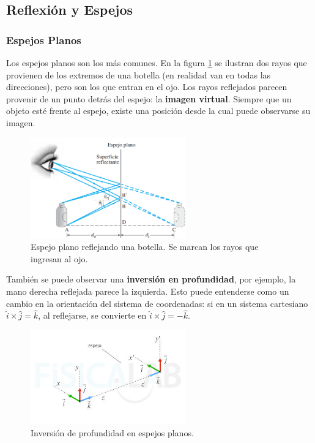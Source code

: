 \subsection{Reflexión y Espejos}

\subsubsection*{Espejos Planos}

Los espejos planos son los más comunes. En la figura \ref{fig:esplejos_planos} se ilustran dos rayos que provienen de los extremos de una botella (en realidad van en todas las direcciones), pero son los que entran en el ojo. Los rayos reflejados parecen provenir de un punto detrás del espejo: la \textbf{imagen virtual}. Siempre que un objeto esté frente al espejo, existe una posición desde la cual puede observarse su imagen.

\begin{figure}[H]
	\centering
	\includegraphics[width=0.6\textwidth]{images/espejo_plano.png}
	\caption{Espejo plano reflejando una botella. Se marcan los rayos que ingresan al ojo.}
	\label{fig:esplejos_planos}
\end{figure}

También se puede observar una \textbf{inversión en profundidad}, por ejemplo, la mano derecha reflejada parece la izquierda. Esto puede entenderse como un cambio en la orientación del sistema de coordenadas: si en un sistema cartesiano $\hat{i} \times \hat{j} = \hat{k}$, al reflejarse, se convierte en $\hat{i} \times \hat{j} = -\hat{k}$.

\begin{figure}[H]
	\centering
	\includegraphics[width=0.6\textwidth]{images/inversion_profundidad.jpg}
	\caption{Inversión de profundidad en espejos planos.}
	\label{fig:inversion_profundidad}
\end{figure}

